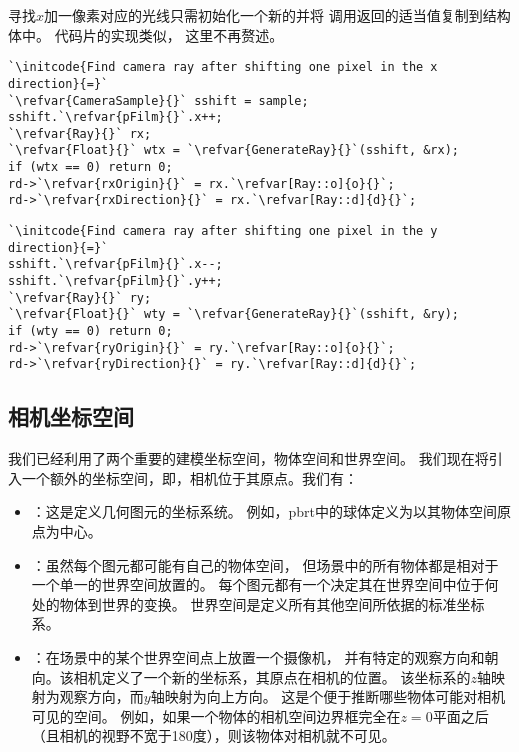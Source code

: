 寻找$x$加一像素对应的光线只需初始化一个新的并将
调用返回的适当值复制到结构体中。
代码片的实现类似，
这里不再赘述。
\begin{lstlisting}
`\initcode{Find camera ray after shifting one pixel in the x direction}{=}`
`\refvar{CameraSample}{}` sshift = sample;
sshift.`\refvar{pFilm}{}`.x++;
`\refvar{Ray}{}` rx;
`\refvar{Float}{}` wtx = `\refvar{GenerateRay}{}`(sshift, &rx);
if (wtx == 0) return 0;
rd->`\refvar{rxOrigin}{}` = rx.`\refvar[Ray::o]{o}{}`;
rd->`\refvar{rxDirection}{}` = rx.`\refvar[Ray::d]{d}{}`;
\end{lstlisting}
\begin{lstlisting}
`\initcode{Find camera ray after shifting one pixel in the y direction}{=}`
sshift.`\refvar{pFilm}{}`.x--;
sshift.`\refvar{pFilm}{}`.y++;
`\refvar{Ray}{}` ry;
`\refvar{Float}{}` wty = `\refvar{GenerateRay}{}`(sshift, &ry);
if (wty == 0) return 0;
rd->`\refvar{ryOrigin}{}` = ry.`\refvar[Ray::o]{o}{}`;
rd->`\refvar{ryDirection}{}` = ry.`\refvar[Ray::d]{d}{}`;
\end{lstlisting}

\subsection{相机坐标空间}\label{sub:相机坐标空间}
我们已经利用了两个重要的建模坐标空间，物体空间和世界空间。
我们现在将引入一个额外的坐标空间，即，相机位于其原点。我们有：
\begin{itemize}
    \item {}：这是定义几何图元的坐标系统。
          例如，pbrt中的球体定义为以其物体空间原点为中心。
    \item {}：虽然每个图元都可能有自己的物体空间，
          但场景中的所有物体都是相对于一个单一的世界空间放置的。
          每个图元都有一个决定其在世界空间中位于何处的物体到世界的变换。
          世界空间是定义所有其他空间所依据的标准坐标系。
    \item {}：在场景中的某个世界空间点上放置一个摄像机，
          并有特定的观察方向和朝向。该相机定义了一个新的坐标系，其原点在相机的位置。
          该坐标系的$z$轴映射为观察方向，而$y$轴映射为向上方向。
          这是个便于推断哪些物体可能对相机可见的空间。
          例如，如果一个物体的相机空间边界框完全在$z=0$平面之后
          （且相机的视野不宽于180度），则该物体对相机就不可见。
\end{itemize}